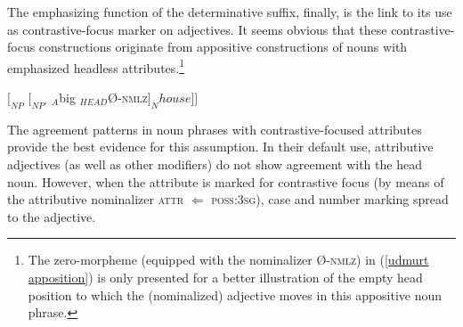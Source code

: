 The emphasizing function of the determinative suffix, finally, is the link to its use as contrastive-focus marker on adjectives. It seems obvious that these contrastive-focus constructions originate from appositive constructions of nouns with emphasized headless attributes.\footnote{The zero-morpheme (equipped with the nominalizer Ø-\textsc{nmlz}) in (\ref{udmurt apposition}) is only presented for a better illustration of the empty head position to which the (nominalized) adjective moves in this appositive noun phrase.}
\begin{exe} \label{udmurt apposition}
\ex $[_{NP}$ $[_{NP'}$ $_{A}$big $_{HEAD}$Ø-\textsc{nmlz}$] _{N}house]]$
\end{exe}
The agreement patterns in noun phrases with contrastive-focused attributes provide the best evidence for this assumption. In their default use, attributive adjectives (as well as other modifiers) do not show agreement with the head noun. However, when the attribute is marked for contrastive focus (by means of the attributive nominalizer \textsc{attr} $\Leftarrow$ \textsc{poss:3sg}), case and number marking spread to the adjective.
